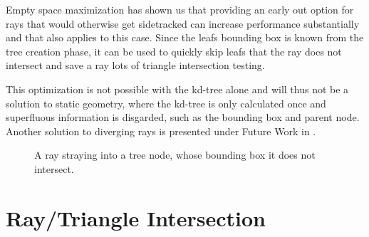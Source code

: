 Empty space maximization has shown us that providing an early out option for
rays that would otherwise get sidetracked can increase performance substantially
and that also applies to this case. Since the leafs bounding box is known from
the tree creation phase, it can be used to quickly skip leafs that the ray does
not intersect and save a ray lots of triangle intersection testing.

This optimization is not possible with the kd-tree alone and will thus not be a
solution to static geometry, where the kd-tree is only calculated once and
superfluous information is disgarded, such as the bounding box and parent
node. Another solution to diverging rays is presented under Future Work in
.

\begin{figure}
  \centering
  \caption{A ray straying into a tree node, whose bounding box it does
    not intersect.}
  \label{fig:waywardRay}
\end{figure}





\section{Ray/Triangle Intersection}\label{sec:intersection}

